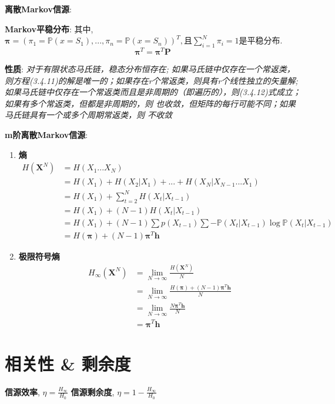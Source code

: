 \documentclass{article}
\newcommand{\env}[2]{\begin{#1}#2\end{#1}}
\newcommand{\defi}[2]{\textbf{#1}, #2}
\newcommand{\bb}{\boldsymbol}
\newcommand{\P}{\mathbb P}
\begin{document}
        \textbf{离散Markov信源}:
        
            \textbf{Markov平稳分布}: 其中, $\bb \pi = (\pi_1 = \P(x = S_1), ..., \pi_n = \P(x = S_n))^T, \text{且} \sum\limits_{i=1}^N \pi_i = 1$是平稳分布.
                \[\bb \pi^T = \bb \pi^T \bb P\]
                
                \textbf{性质}: \textit{对于有限状态马氏链，稳态分布恒存在; 如果马氏链中仅存在一个常返类，则方程(3.4.11)的解是唯一的；如果存在r个常返类，则具有r个线性独立的矢量解; 如果马氏链中仅存在一个常返类而且是非周期的（即遍历的），则(3.4.12)式成立；如果有多个常返类，但都是非周期的，则       也收敛，但矩阵的每行可能不同；如果马氏链具有一个或多个周期常返类，则      不收敛}

        \textbf{m阶离散Markov信源}:
            \env{enumerate}{
            \item \textbf{熵}
                \env{align*}{
                    H(\bb X^N) &= H(X_1 ... X_N)\\
                    &= H(X_1) + H(X_2|X_1) + ... + H(X_N | X_{N-1} ... X_1) \tag{条件熵展开}\\
                    &= H(X_1) + \sum\limits_{t=2}^N H(X_t | X_{t-1}) \tag{Markov性}\\
                    &= H(X_1) + (N-1) H(X_t | X_{t-1}) \tag{平稳性}\\
                    &= H(X_1) + (N-1) \sum p(X_{t-1}) \sum - \P(X_t | X_{t-1}) \log \P(X_t | X_{t-1}) \tag{条件熵代入}\\
                    &= H(\bb \pi) + (N-1)  \bb \pi^T \bb h \tag{平稳分布$\bb \pi$代入}
                }
            \item \textbf{极限符号熵}
                \env{align*}{
                    H_\infty(\bb X^N) &= \lim\limits_{N \to \infty}\frac{H(\bb X^N)}{N} \tag{定义}\\
                    &= \lim\limits_{N \to \infty} \frac{H(\bb \pi) + (N-1)  \bb \pi^T \bb h}{N} \tag{代入}\\
                    &= \lim\limits_{N \to \infty} \frac{N \bb \pi^T \bb h}{N} \tag{省略$\to 0$量}\\
                    &= \bb \pi^T \bb h
                }
            }


    \section{相关性 \& 剩余度}
        \defi{信源效率}{$\eta = \frac{H_\infty}{H_0}$}
        \defi{信源剩余度}{$\eta = 1 - \frac{H_\infty}{H_0}$}
            
\end{document}
